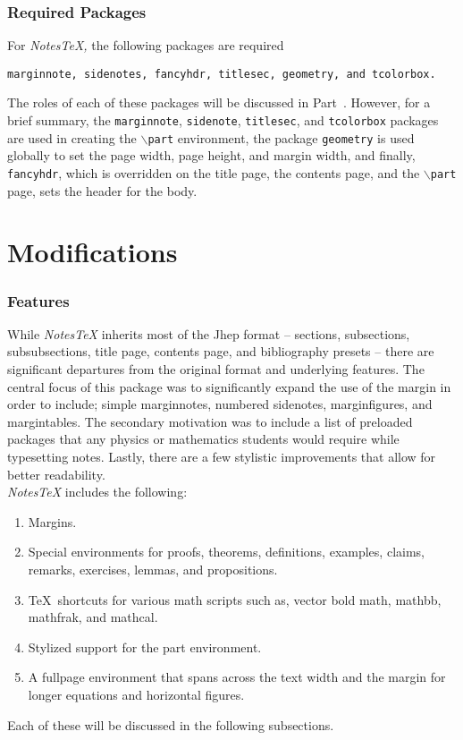 \documentclass[10pt]{article}
\begin{document}
	\section{Required Packages}\label{Sec: Required Packages}
	For \textit{NotesTeX,} the following packages are required
	\begin{center}
		\texttt{marginnote, sidenotes, fancyhdr, titlesec, geometry, and tcolorbox.}
	\end{center}
	The roles of each of these packages will be discussed in Part~\ref{Part:Modification}. However, for a brief summary, the \texttt{marginnote}, \texttt{sidenote}, \texttt{titlesec}, and \texttt{tcolorbox} packages are used in creating the \texttt{$\backslash$part} environment, the package \texttt{geometry} is used globally to set the page width, page height, and margin width, and finally, \texttt{fancyhdr}, which is overridden on the title page, the contents page, and the \texttt{$\backslash$part} page, sets the header for the body.

	\newpage

	\part{Modifications}\label{Part:Modification}
	\section{Features}\label{Sub:Features}
	While \textit{NotesTeX} inherits most of the Jhep format -- sections, subsections, subsubsections, title page, contents page, and bibliography presets -- there are significant departures from the original format and underlying features. The central focus of this package was to significantly expand the use of the margin in order to include; simple marginnotes, numbered sidenotes, marginfigures, and margintables. The secondary motivation was to include a list of preloaded packages that any physics or mathematics students would require while typesetting notes. Lastly, there are a few stylistic improvements that allow for better readability.\\

	\noindent \textit{NotesTeX} includes the following:
	\begin{enumerate}
		\item Margins.
		\item Special environments for proofs, theorems, definitions, examples, claims, remarks, exercises, lemmas, and propositions.
		\item \TeX\ shortcuts for various math scripts such as, vector bold math, mathbb, mathfrak, and mathcal.
		\item Stylized support for the part environment.
		\item A fullpage environment that spans across the text width and the margin for longer equations and horizontal figures.
	\end{enumerate}
	Each of these will be discussed in the following subsections.
\end{document}
